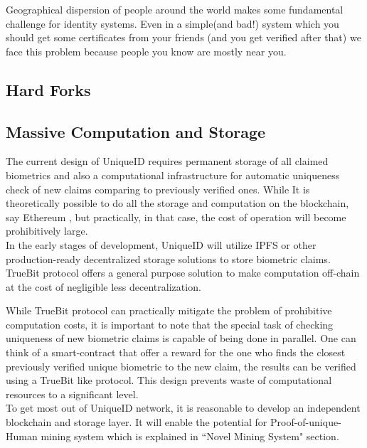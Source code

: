 \documentclass[conference]{IEEEtran}
\begin{document}
Geographical dispersion of people around the world makes some fundamental challenge for identity systems. Even in a simple(and bad!) system which you should get some certificates from your friends (and you get verified after that) we face this problem because people you know are mostly near you. 





\subsection{Hard Forks}
\subsection{Massive Computation and Storage}
The current design of UniqueID requires permanent storage of all claimed biometrics and also a computational infrastructure for automatic uniqueness check of new claims comparing to previously verified ones. While It is theoretically possible to do all the storage and computation on the blockchain, say Ethereum \cite{ethereum}, but practically, in that case, the cost of operation will become prohibitively large. \\
In the early stages of development, UniqueID will utilize IPFS or other production-ready decentralized storage solutions to store biometric claims. TrueBit protocol offers a general purpose solution to make computation off-chain at the cost of negligible less decentralization. 


While TrueBit protocol can practically mitigate the problem of prohibitive computation costs, it is important to note that the special task of checking uniqueness of new biometric claims is capable of being done in parallel. One can think of a smart-contract that offer a reward for the one who finds the closest previously verified unique biometric to the new claim, the results can be verified using a TrueBit like protocol. This design prevents waste of computational resources to a significant level.\\
To get most out of UniqueID network, it is reasonable to develop an independent blockchain and storage layer. It will enable the potential for Proof-of-unique-Human mining system which is explained in ``Novel Mining System" section. 
\end{document}
